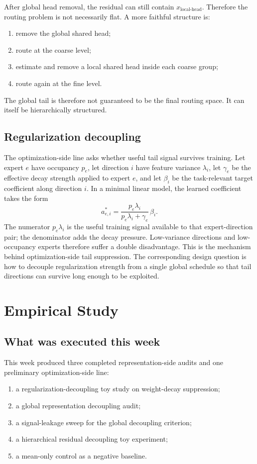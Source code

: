 \documentclass[11pt]{article}
\begin{document}
After global head removal, the residual can still contain $x_{\text{local-head}}$. Therefore the routing problem is not necessarily flat. A more faithful structure is:
\begin{enumerate}[leftmargin=1.5em]
    \item remove the global shared head;
    \item route at the coarse level;
    \item estimate and remove a local shared head inside each coarse group;
    \item route again at the fine level.
\end{enumerate}

The global tail is therefore not guaranteed to be the final routing space. It can itself be hierarchically structured.

\subsection{Regularization decoupling}

The optimization-side line asks whether useful tail signal survives training. Let expert $e$ have occupancy $p_e$, let direction $i$ have feature variance $\lambda_i$, let $\gamma_e$ be the effective decay strength applied to expert $e$, and let $\beta_i$ be the task-relevant target coefficient along direction $i$. In a minimal linear model, the learned coefficient takes the form
\[
a_{e,i}^{*}
=
\frac{p_e \lambda_i}{p_e \lambda_i + \gamma_e}\,\beta_i.
\]
The numerator $p_e \lambda_i$ is the useful training signal available to that expert-direction pair; the denominator adds the decay pressure. Low-variance directions and low-occupancy experts therefore suffer a double disadvantage. This is the mechanism behind optimization-side tail suppression. The corresponding design question is how to decouple regularization strength from a single global schedule so that tail directions can survive long enough to be exploited.

\section{Empirical Study}

\subsection{What was executed this week}

This week produced three completed representation-side audits and one preliminary optimization-side line:
\begin{enumerate}[leftmargin=1.5em]
    \item a regularization-decoupling toy study on weight-decay suppression;
    \item a global representation decoupling audit;
    \item a signal-leakage sweep for the global decoupling criterion;
    \item a hierarchical residual decoupling toy experiment;
    \item a mean-only control as a negative baseline.
\end{enumerate}
\end{document}
